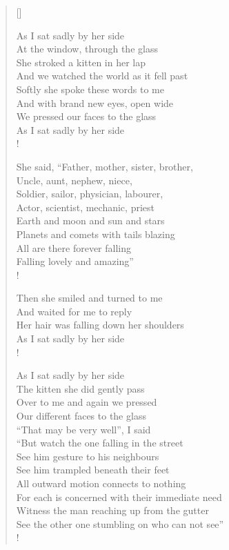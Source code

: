 \documentclass[11pt, a4paper]{article} %
\newcommand{\poemauthorright}[1]{\nopagebreak{\raggedleft\footnotesize\textsc{#1}\par}} %
\begin{document}

\poemauthorright{Nick Cave and the Bad Seeds} %

\settowidth{\versewidth}{Because it was grassy and wanted wear;} %

\begin{verse}[\versewidth]

As I sat sadly by her side \\
At the window, through the glass \\
She stroked a kitten in her lap \\
And we watched the world as it fell past \\
Softly she spoke these words to me \\
And with brand new eyes, open wide \\
We pressed our faces to the glass \\
As I sat sadly by her side \\!

She said, \textquotedblleft Father, mother, sister, brother, \\
Uncle, aunt, nephew, niece, \\
Soldier, sailor, physician, labourer, \\
Actor, scientist, mechanic, priest \\
Earth and moon and sun and stars \\
Planets and comets with tails blazing \\
All are there forever falling \\
Falling lovely and amazing\textquotedblright \\!

Then she smiled and turned to me \\
And waited for me to reply \\
Her hair was falling down her shoulders \\
As I sat sadly by her side \\!

As I sat sadly by her side \\
The kitten she did gently pass \\
Over to me and again we pressed \\
Our different faces to the glass \\
“That may be very well”, I said \\
“But watch the one falling in the street \\
See him gesture to his neighbours \\
See him trampled beneath their feet \\
All outward motion connects to nothing \\
For each is concerned with their immediate need \\
Witness the man reaching up from the gutter \\
See the other one stumbling on who can not see” \\!


\end{verse}
\end{document}
